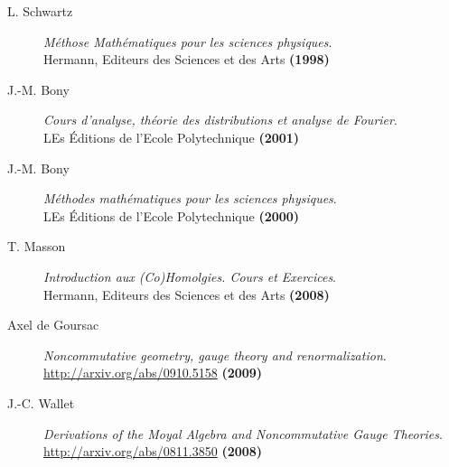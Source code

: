 \documentclass[a4paper,11pt]{article}
\theoremstyle{plain}
\theoremstyle{definition}
\theoremstyle{remark}
\numberwithin{equation}{section}
\numberwithin{equation}{subsection}
\numberwithin{figure}{section}
\begin{document}
\begin{description}
\item[L. Schwartz]\emph{Méthose Mathématiques pour les sciences physiques}. \\
Hermann, Editeurs des Sciences et des Arts \textbf{(1998)}

\item[J.-M. Bony]\emph{Cours d'analyse, théorie des distributions et analyse de Fourier}. \\
LEs Éditions de l'Ecole Polytechnique \textbf{(2001)}

\item[J.-M. Bony]\emph{Méthodes mathématiques pour les sciences physiques}. \\
LEs Éditions de l'Ecole Polytechnique \textbf{(2000)}

\item[T. Masson]\emph{Introduction aux (Co)Homolgies. Cours et Exercices}. \\
Hermann, Editeurs des Sciences et des Arts  \textbf{(2008)}

\item[Axel de Goursac]\emph{Noncommutative geometry, gauge theory and renormalization}. \\
\href{http://arxiv.org/abs/0910.5158}{http://arxiv.org/abs/0910.5158}  \textbf{(2009)}

\item[J.-C. Wallet]\emph{Derivations of the Moyal Algebra and Noncommutative Gauge Theories}. \\
\href{http://arxiv.org/abs/0811.3850}{http://arxiv.org/abs/0811.3850}  \textbf{(2008)}

\end{description}
\end{document}
